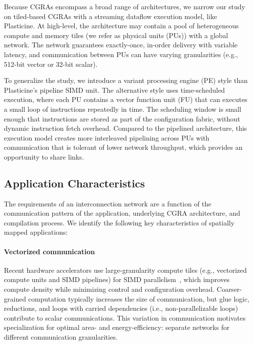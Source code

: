 Because CGRAs encompass a broad range of architectures, we narrow our study on tiled-based CGRAs with
a streaming dataflow execution model, like Plasticine.
At high-level, the architecture may contain a pool of heterogeneous compute and memory tiles (we
refer as physical units (PUs)) with a global network.
The network guarantees exactly-once, in-order delivery with variable latency, and communication 
between PUs can have varying granularities (e.g., 512-bit vector or 32-bit scalar).

To generalize the study, we introduce a variant processing engine (PE) style than Plasticine's
pipeline SIMD unit.
The alternative style uses time-scheduled execution, where each PU 
contains a vector function unit (FU) that can executes a small loop of instructions repeatedly in
time.
The scheduling window is small enough that instructions are stored as part of the configuration fabric, 
without dynamic instruction fetch overhead. 
Compared to the pipelined architecture, 
this execution model creates more interleaved pipelining across PUs with communication that is tolerant of lower network throughput, which provides an opportunity to share links.

\subsection{Application Characteristics} \label{sec:appchar}
The requirements of an interconnection network are a function of the communication pattern of the
application, underlying CGRA architecture, and compilation process.
We identify the following key characteristics of spatially mapped applications:

\paragraph{Vectorized communication}
Recent hardware accelerators use large-granularity compute tiles (e.g., vectorized compute units and SIMD pipelines) for
SIMD parallelism~\cite{plasticine, xilinx-acap}, which improves compute density while minimizing control and configuration overhead. 
Coarser-grained computation typically increases the size of communication, but glue logic, reductions, and loops with carried dependencies (i.e., non-parallelizable loops) contribute to scalar communications. 
This variation in communication motivates specialization for optimal area- and energy-efficiency: separate networks for different communication granularities.

